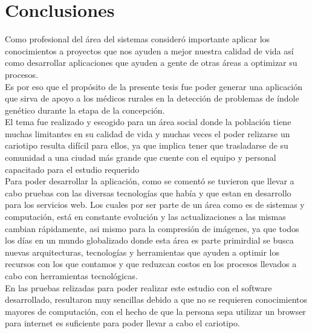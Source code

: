 \documentclass[12pt,letterpaper,titlepage]{article}
\begin{document}
\begin{itemize}
\begin{itemize}
\end{itemize}



\chapter{Conclusiones}\label{conclusiones}
Como profesional del área del sistemas consideró importante aplicar los conocimientos a proyectos que nos ayuden a mejor nuestra calidad de vida así como desarrollar aplicaciones que ayuden a gente de otras áreas a optimizar su procesos.\\

Es por eso que el propósito de la presente tesis fue poder generar una aplicación que sirva de apoyo a los médicos rurales en la detección de problemas de índole genético durante la etapa de la concepción.\\

El tema fue realizado y escogido para un área social donde la población tiene muchas limitantes en su calidad de vida y muchas veces el poder relizarse un cariotipo resulta difícil para ellos, ya que implica tener que trasladarse de su comunidad a una ciudad más grande que cuente con el equipo y personal capacitado para el estudio requerido \\

Para poder desarrollar la aplicación, como se comentó se tuvieron que llevar a cabo pruebas con las diversas tecnologías que había y que estan en desarrollo para los servicios web. Los cuales por ser parte de un área como es de sistemas y computación, está en constante evolución y las actualizaciones a las mismas cambian rápidamente, asi mismo para la compresión de imágenes, ya que todos los días en un mundo globalizado donde esta área es parte primirdial se busca nuevas arquitecturas, tecnologías y herramientas que ayuden a optimir los recursos con los que contamos y que reduzcan costos en los procesos llevados a cabo con herramientas tecnológicas.\\

En las pruebas relizadas para poder realizar este estudio con el software desarrollado, resultaron muy sencillas debido a que no se requieren conocimientos mayores de computación, con el hecho de que la persona sepa utilizar un browser para internet es suficiente para poder llevar a cabo el cariotipo.\\


\end{itemize}
\end{document}
